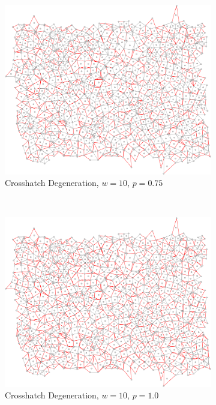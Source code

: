 \documentclass[a4paper,11pt]{report}
\begin{document}
\begin{figure}[htp]
\begin{subfigure}[t]{0.4\textwidth}
  \end{subfigure}

\begin{subfigure}[t]{0.4\textwidth}
  \centering
  \includegraphics[width=\textwidth]{ch6_figs/cross_hatch_p75_w10}
  \caption{Crosshatch Degeneration, $w=10$, $p=0.75$}

  \end{subfigure}
~
\begin{subfigure}[t]{0.4\textwidth}
  \centering
  \includegraphics[width=\textwidth]{ch6_figs/cross_hatch_p100_w10}
  \caption{Crosshatch Degeneration, $w=10$, $p=1.0$}

  \end{subfigure}

\caption[Crosshatch Degeneration, $w=10$]{
}

\end{figure}
\end{document}
